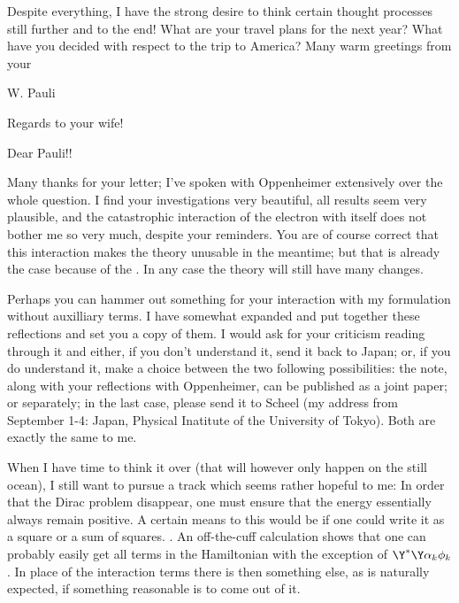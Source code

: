 \documentclass{article}
\begin{document}
Despite everything, I have the strong desire to think certain thought processes still further and to the end! What are your travel plans for the next year? What have you decided with respect to the trip to America? Many warm greetings from your

W. Pauli

Regards to your wife!

\date{July 20, 1929}

Dear Pauli!!

Many thanks for your letter; I've spoken with Oppenheimer extensively over the whole question. I find your investigations very beautiful, all results seem very plausible, and the catastrophic interaction of the electron with itself does not bother me so very much, despite your reminders. You are of course correct that this interaction makes the theory unusable in the meantime; but that is already the case because of the . In any case the theory will still have many changes.

Perhaps you can hammer out something for your interaction with my formulation without auxilliary terms. I have somewhat expanded and put together these reflections and set you a copy of them. I would ask for your criticism reading through it and either, if you don't understand it, send it back to Japan; or, if you do understand it, make a choice between the two following possibilities: the note, along with your reflections with Oppenheimer, can be published as a joint paper; or separately; in the last case, please send it to Scheel (my address from September 1-4: Japan, Physical Inatitute of the University of Tokyo). Both are exactly the same to me.

When I have time to think it over (that will however only happen on the still ocean), I still want to pursue a track which seems rather hopeful to me: In order that the Dirac problem disappear, one must ensure that the energy essentially always remain positive. A certain means to this would be if one could write it as a square or a sum of squares. . An off-the-cuff calculation shows that one can probably easily get all terms in the Hamiltonian with the exception of $\Y^* \Y \alpha_k \phi_k$. In place of the interaction terms there is then something else, as is naturally expected, if something reasonable is to come out of it.
\end{document}
